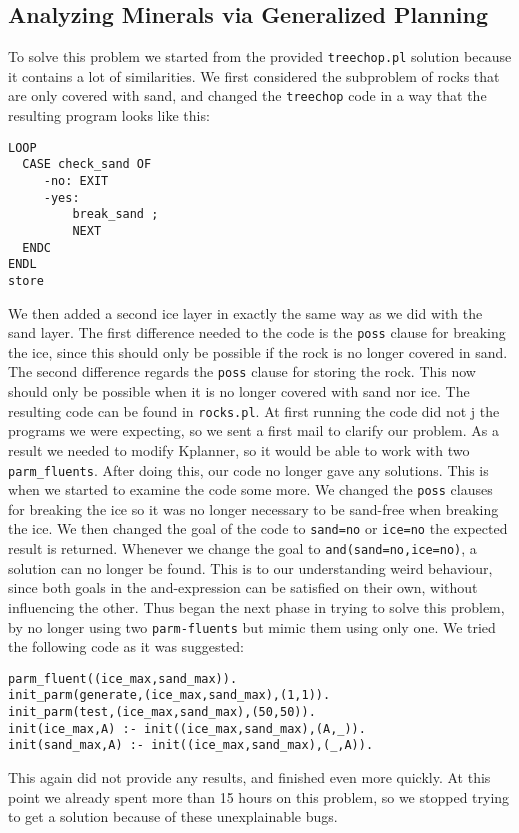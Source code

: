 \documentclass{article}
\begin{document}
\subsection{Analyzing Minerals via Generalized Planning}
To solve this problem we started from the provided \texttt{treechop.pl} solution because it contains a lot of similarities. We first considered the subproblem of rocks that are only covered with sand, and changed the \texttt{treechop} code in a way that the resulting program looks like this:
\begin{verbatim}
LOOP
  CASE check_sand OF
     -no: EXIT
     -yes:
         break_sand ;
         NEXT
  ENDC
ENDL
store
\end{verbatim}
We then added a second ice layer in exactly the same way as we did with the sand layer. The first difference needed to the code is the \texttt{poss} clause for breaking the ice, since this should only be possible if the rock is no longer covered in sand. The second difference regards the \texttt{poss} clause for storing the rock. This now should only be possible when it is no longer covered with sand nor ice. The resulting code can be found in \texttt{rocks.pl}. At first running the code did not j the programs we were expecting, so we sent a first mail to clarify our problem. As a result we needed to modify Kplanner, so it would be able to work with two \texttt{parm\_fluents}. After doing this, our code no longer gave any solutions. 
This is when we started to examine the code some more. We changed the \texttt{poss} clauses for breaking the ice so it was no longer necessary to be sand-free when breaking the ice. 
We then changed the goal of the code to \texttt{sand=no} or \texttt{ice=no} the expected result is returned.
Whenever we change the goal to \texttt{and(sand=no,ice=no)}, a solution can no longer be found. This is to our understanding weird behaviour, since both goals in the and-expression can be satisfied on their own, without influencing the other. 
Thus began the next phase in trying to solve this problem, by no longer using two \texttt{parm-fluents} but mimic them using only one. We tried the following code as it was suggested:
\begin{verbatim}
parm_fluent((ice_max,sand_max)).
init_parm(generate,(ice_max,sand_max),(1,1)). 
init_parm(test,(ice_max,sand_max),(50,50)).  
init(ice_max,A) :- init((ice_max,sand_max),(A,_)).
init(sand_max,A) :- init((ice_max,sand_max),(_,A)).
\end{verbatim}
This again did not provide any results, and finished even more quickly.
At this point we already spent more than 15 hours on this problem, so we stopped trying to get a solution because of these unexplainable bugs.
\end{document}

